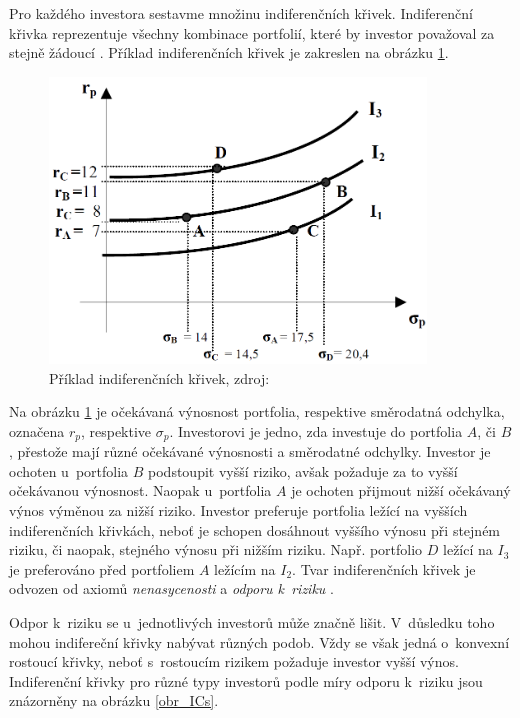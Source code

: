 \documentclass[12pt,a4paper]{report}
\begin{document}
Pro každého investora sestavme množinu indiferenčních křivek. Indiferenční křivka reprezentuje všechny kombinace portfolií, které by investor považoval za stejně žádoucí \cite{camsky}. Příklad indiferenčních křivek je zakreslen na obrázku \ref{obr_IC}.

\begin{figure}[htb]
\centering
\includegraphics[width=10cm]{IC0.png}
\caption{Příklad indiferenčních křivek, zdroj: \cite{camsky} \label{obr_IC}}
\end{figure}
Na obrázku \ref{obr_IC} je očekávaná výnosnost portfolia, respektive směrodatná odchylka, označena $r_p$, respektive $\sigma_p$. Investorovi je jedno, zda investuje do portfolia $A$, či $B$, přestože mají různé očekávané výnosnosti a směrodatné odchylky. Investor je ochoten u~portfolia $B$ podstoupit vyšší riziko, avšak požaduje za to vyšší očekávanou výnosnost. Naopak u~portfolia $A$ je ochoten přijmout nižší očekávaný výnos výměnou za nižší riziko. Investor preferuje portfolia ležící na vyšších indiferenčních křivkách, neboť je schopen dosáhnout vyššího výnosu při stejném riziku, či naopak, stejného výnosu při nižším riziku. Např. portfolio $D$ ležící na $I_3$ je preferováno před portfoliem $A$ ležícím na $I_2$.  Tvar indiferenčních křivek je odvozen od axiomů \emph{nenasycenosti} a \emph{odporu k~riziku} \cite{camsky}.

Odpor k~riziku se u~jednotlivých investorů může značně lišit. V~důsledku toho mohou indifereční křivky nabývat různých podob. Vždy se však jedná o~konvexní rostoucí křivky, neboť s~rostoucím rizikem požaduje investor vyšší výnos. Indiferenční křivky pro různé typy investorů podle míry odporu k~riziku jsou znázorněny na obrázku \ref{obr_ICs}.
 
\end{document}
